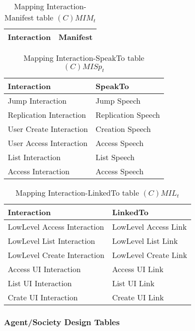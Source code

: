 \begin{table}[H]
	\centering
	\begin{tabular}{|p{4cm}|p{8cm}|}
			\hline
			\textbf{Interaction} & \textbf{Manifest} \\
			\hline
			\hline
		\end{tabular}
	\caption{Mapping Interaction-Manifest table $(C)MIM_t$}
	\label{tab:cmimt}
\end{table}

\begin{table}[H]
	\centering
	\begin{tabular}{|p{4cm}|p{8cm}|}
			\hline
			\textbf{Interaction} & \textbf{SpeakTo} \\
			\hline
			Jump Interaction & Jump Speech \\
			\hline
			Replication Interaction & Replication Speech \\
			\hline
			User Create Interaction & Creation Speech \\
			\hline
			User Access Interaction & Access Speech \\
			\hline
			List Interaction & List Speech \\
			\hline
			Access Interaction & Access Speech \\
			\hline
		\end{tabular}
	\caption{Mapping Interaction-SpeakTo table $(C)MISp_t$}
	\label{tab:cmispt}
\end{table}

\begin{table}[H]
	\centering
	\begin{tabular}{|p{4cm}|p{8cm}|}
			\hline
			\textbf{Interaction} & \textbf{LinkedTo} \\
			\hline
			LowLevel Access Interaction & LowLevel Access Link\\
			\hline
			LowLevel List Interaction & LowLevel List Link \\
			\hline
			LowLevel Create Interaction & LowLevel Create Link \\
			\hline
			Access UI Interaction & Access UI Link\\
			\hline
			List UI Interaction & List UI Link\\
			\hline
			Crate UI Interaction & Create UI Link\\
			\hline
		\end{tabular}
	\caption{Mapping Interaction-LinkedTo table $(C)MIL_t$}
	\label{tab:cmilt}
\end{table}

\subsubsection{Agent/Society Design Tables}

